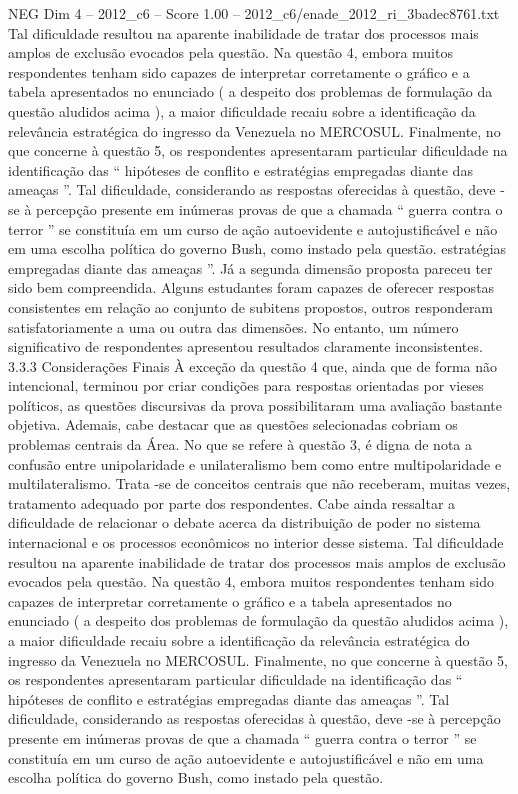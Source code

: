 \begin{textsample}{NEG Dim 4 – 2012\_c6 – Score 1.00 – 2012\_c6/enade\_2012\_ri\_3badec8761.txt}
Tal dificuldade resultou na aparente inabilidade de tratar dos processos mais amplos de exclusão evocados pela questão.
Na questão 4, embora muitos respondentes tenham sido capazes de interpretar corretamente o gráfico e a tabela apresentados no enunciado ( a despeito dos problemas de formulação da questão aludidos acima ), a maior dificuldade recaiu sobre a identificação da relevância estratégica do ingresso da Venezuela no MERCOSUL.
Finalmente, no que concerne à questão 5, os respondentes apresentaram particular dificuldade na identificação das “ hipóteses de conflito e estratégias empregadas diante das ameaças ”.
Tal dificuldade, considerando as respostas oferecidas à questão, deve -se à percepção presente em inúmeras provas de que a chamada “ guerra contra o terror ” se constituía em um curso de ação autoevidente e autojustificável e não em uma escolha política do governo Bush, como instado pela questão. estratégias empregadas diante das ameaças ”.
Já a segunda dimensão proposta pareceu ter sido bem compreendida.
Alguns estudantes foram capazes de oferecer respostas consistentes em relação ao conjunto de subitens propostos, outros responderam satisfatoriamente a uma ou outra das dimensões.
No entanto, um número significativo de respondentes apresentou resultados claramente inconsistentes. 3.3.3 Considerações Finais À exceção da questão 4 que, ainda que de forma não intencional, terminou por criar condições para respostas orientadas por vieses políticos, as questões discursivas da prova possibilitaram uma avaliação bastante objetiva.
Ademais, cabe destacar que as questões selecionadas cobriam os problemas centrais da Área.
No que se refere à questão 3, é digna de nota a confusão entre unipolaridade e unilateralismo bem como entre multipolaridade e multilateralismo.
Trata -se de conceitos centrais que não receberam, muitas vezes, tratamento adequado por parte dos respondentes.
Cabe ainda ressaltar a dificuldade de relacionar o debate acerca da distribuição de poder no sistema internacional e os processos econômicos no interior desse sistema.
Tal dificuldade resultou na aparente inabilidade de tratar dos processos mais amplos de exclusão evocados pela questão.
Na questão 4, embora muitos respondentes tenham sido capazes de interpretar corretamente o gráfico e a tabela apresentados no enunciado ( a despeito dos problemas de formulação da questão aludidos acima ), a maior dificuldade recaiu sobre a identificação da relevância estratégica do ingresso da Venezuela no MERCOSUL.
Finalmente, no que concerne à questão 5, os respondentes apresentaram particular dificuldade na identificação das “ hipóteses de conflito e estratégias empregadas diante das ameaças ”.
Tal dificuldade, considerando as respostas oferecidas à questão, deve -se à percepção presente em inúmeras provas de que a chamada “ guerra contra o terror ” se constituía em um curso de ação autoevidente e autojustificável e não em uma escolha política do governo Bush, como instado pela questão.

\end{textsample}
